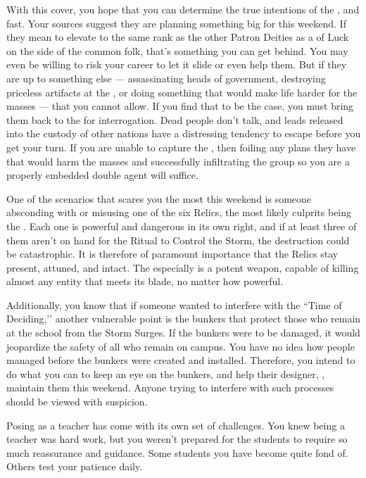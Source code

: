 \documentclass[char]{GL2020}
\begin{document}
With this cover, you hope that you can determine the true intentions of the \pGoaties{}, and fast. Your sources suggest they are planning something big for this weekend. If they mean to elevate \cGenesis{} to the same rank as the other Patron Deities as a \cGenesis{\Deity} of Luck on the side of the common folk, that's something you can get behind. You may even be willing to risk your career to let it slide or even help them. But if they are up to something else — assassinating heads of government, destroying priceless artifacts at the \pSchool{}, or doing something that would make life harder for the masses — that you cannot allow. If you find that to be the case, you must bring them back to the \pFarm{} for interrogation. Dead people don't talk, and leads released into the custody of other nations have a distressing tendency to escape before you get your turn. If you are unable to capture the \pGoaties{}, then foiling any plans they have that would harm the masses and successfully infiltrating the group so you are a properly embedded double agent will suffice.

One of the scenarios that scares you the most this weekend is someone absconding with or misusing one of the six Relics, the most likely culprits being the \pGoaties{}. Each one is powerful and dangerous in its own right, and if at least three of them aren't on hand for the Ritual to Control the Storm, the destruction could be catastrophic. It is therefore of paramount importance that the Relics stay present, attuned, and intact. The \iScythe{} especially is a potent weapon, capable of killing almost any entity that meets its blade, no matter how powerful.

Additionally, you know that if someone wanted to interfere with the ``Time of Deciding,’’ another vulnerable point is the bunkers that protect those who remain at the school from the Storm Surges. If the bunkers were to be damaged, it would jeopardize the safety of all who remain on campus. You have no idea how people managed before the bunkers were created and installed. Therefore, you intend to do what you can to keep an eye on the bunkers, and help their designer, \cBunker{\intro}, maintain them this weekend. Anyone trying to interfere with such processes should be viewed with suspicion.

Posing as a teacher has come with its own set of challenges. You knew being a teacher was hard work, but you weren't prepared for the students to require so much reassurance and guidance. Some students you have become quite fond of. Others test your patience daily.
\end{document}
